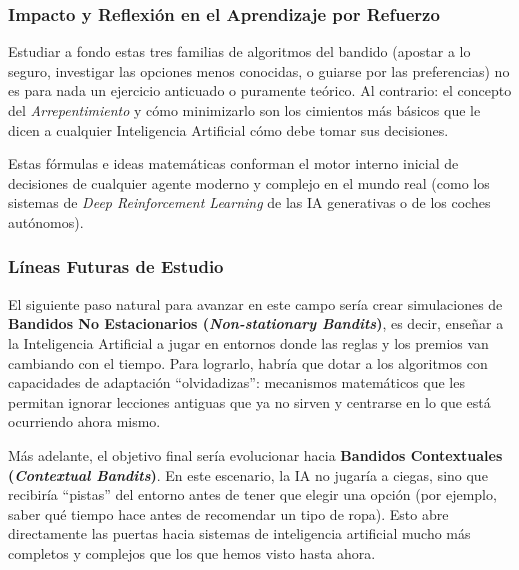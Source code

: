 \subsubsection{Impacto y Reflexión en el Aprendizaje por
Refuerzo}\label{impacto-y-reflexiuxf3n-en-el-aprendizaje-por-refuerzo}

Estudiar a fondo estas tres familias de algoritmos del bandido (apostar
a lo seguro, investigar las opciones menos conocidas, o guiarse por las
preferencias) no es para nada un ejercicio anticuado o puramente
teórico. Al contrario: el concepto del \emph{Arrepentimiento} y cómo
minimizarlo son los cimientos más básicos que le dicen a cualquier
Inteligencia Artificial cómo debe tomar sus decisiones.

Estas fórmulas e ideas matemáticas conforman el motor interno inicial de
decisiones de cualquier agente moderno y complejo en el mundo real (como
los sistemas de \emph{Deep Reinforcement Learning} de las IA generativas
o de los coches autónomos).

\subsubsection{Líneas Futuras de
Estudio}\label{luxedneas-futuras-de-estudio}

El siguiente paso natural para avanzar en este campo sería crear
simulaciones de \textbf{Bandidos No Estacionarios (\emph{Non-stationary
Bandits})}, es decir, enseñar a la Inteligencia Artificial a jugar en
entornos donde las reglas y los premios van cambiando con el tiempo.
Para lograrlo, habría que dotar a los algoritmos con capacidades de
adaptación ``olvidadizas'': mecanismos matemáticos que les permitan
ignorar lecciones antiguas que ya no sirven y centrarse en lo que está
ocurriendo ahora mismo.

Más adelante, el objetivo final sería evolucionar hacia \textbf{Bandidos
Contextuales (\emph{Contextual Bandits})}. En este escenario, la IA no
jugaría a ciegas, sino que recibiría ``pistas'' del entorno antes de
tener que elegir una opción (por ejemplo, saber qué tiempo hace antes de
recomendar un tipo de ropa). Esto abre directamente las puertas hacia
sistemas de inteligencia artificial mucho más completos y complejos que
los que hemos visto hasta ahora.
